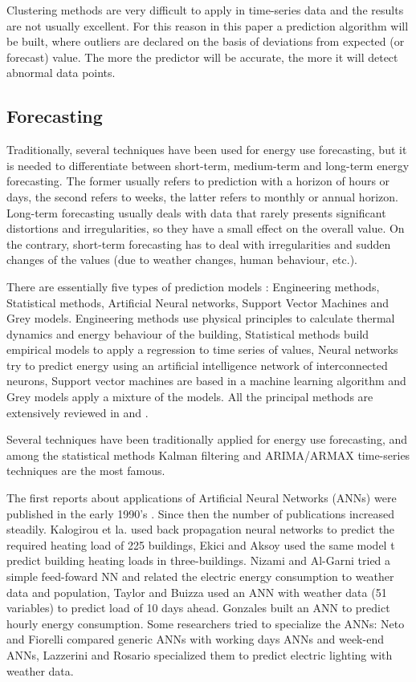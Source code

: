 \documentclass{sig-alternate-sigmod07}
\begin{document}
Clustering methods are very difficult to apply in time-series data and the results are not usually excellent. For this reason in this paper a prediction algorithm will be built, where outliers are declared on the basis of deviations from expected (or forecast) value. The more the predictor will be accurate, the more it will detect abnormal data points.


\subsection{Forecasting}
Traditionally, several techniques have been used for energy use forecasting, but it is needed to differentiate between short-term, medium-term and long-term energy forecasting. The former usually refers to prediction with a horizon of hours or days, the second refers to weeks, the latter refers to monthly or annual horizon. Long-term forecasting usually deals with data that rarely presents significant distortions and irregularities, so they have a small effect on the overall value. On the contrary, short-term forecasting has to deal with irregularities and sudden changes of the values (due to weather changes, human behaviour, etc.). 

There are essentially five types of prediction models \cite{zhao2012review}: Engineering methods, Statistical methods, Artificial Neural networks, Support Vector Machines and Grey models. Engineering methods use physical principles to calculate thermal dynamics and energy behaviour of the building, Statistical methods build empirical models to apply a regression to time series of values, Neural networks try to predict energy using an artificial intelligence network of interconnected neurons, Support vector machines are based in a machine learning algorithm and Grey models apply a mixture of the models. All the principal methods are extensively reviewed in \cite{zhao2012review} and \cite{hippert2001neural}. 

Several techniques have been traditionally applied for energy use forecasting, and among the statistical methods Kalman filtering and ARIMA/ARMAX time-series techniques are the most famous. 

The first reports about applications of Artificial Neural Networks (ANNs) were published in the early 1990's \cite{czernichow1996short}. Since then the number of publications increased steadily. Kalogirou et la. \cite{kalogirou2006artificial} used back propagation neural networks to predict the required heating load of 225 buildings, Ekici and Aksoy used the same model t predict building heating loads in three-buildings. Nizami and Al-Garni \cite{JaveedNizami19951097} tried a simple feed-foward NN and related the electric energy consumption to weather data and population, Taylor and Buizza \cite{taylor2002neural} used an ANN with weather data (51 variables) to predict load of 10 days ahead. Gonzales \cite{gonzalez2005prediction} built an ANN to predict hourly energy consumption.
Some researchers tried to specialize the ANNs: Neto and Fiorelli \cite{neto2008comparison} compared generic ANNs with working days ANNs and week-end ANNs, Lazzerini and Rosario \cite{d2012neural} specialized them to predict electric lighting with weather data. 
\end{document}

